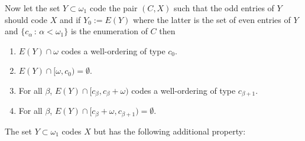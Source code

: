 \documentclass[a4paper,11pt]{article}
\begin{document}
Now let the set $Y\subset \omega_1$ code the pair $(C, X)$ such that the odd entries of $Y$ should code $X$ and if $Y_0:=E(Y)$ where the latter is the set of even entries of $Y$ and $\{c_{\alpha} \, : \, \alpha < \omega_1\}$ is the enumeration of $C$ then
\begin{enumerate}
\item $E(Y) \cap \omega$ codes a well-ordering of type $c_0$.
\item $E(Y) \cap [\omega, c_0) = \emptyset$.
\item For all $\beta$, $E(Y) \cap [c_{\beta}, c_{\beta} + \omega)$ codes a well-ordering of type $c_{\beta+1}$.
\item For all $\beta$, $E(Y) \cap [c_{\beta}+\omega, c_{\beta+1})= \emptyset$.
\end{enumerate}
The set $Y\subset \omega_1$ codes $X$ but has the following additional property:
\end{document}
